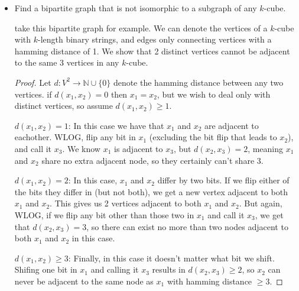 \documentclass[11pt]{article}
\newcommand\itm[1]{\item[\textbf{#1}]}
\newcommand{\n}{\vspace{0.5cm}}
\begin{document}
\begin{itemize}
  \itm{1.4.4} Find a bipartite graph that is not isomorphic to a subgraph of any \(k\)-cube.

    \begin{center}
    \end{center}

    take this bipartite graph for example.  We can denote the vertices of a \(k\)-cube with \(k\)-length binary strings, and edges only connecting vertices with a hamming distance of 1.  We show that 2 distinct vertices cannot be adjacent to the same 3 vertices in any \(k\)-cube.
      \begin{proof}
        Let \(d \colon V^2 \to \mathbb{N} \cup \{0\}\) denote the hamming distance between any two vertices.  if \(d(x_1,x_2) = 0\) then \(x_1 = x_2\), but we wish to deal only with distinct vertices, so assume \(d(x_1,x_2) \geq 1\). \n

        \(d(x_1, x_2) = 1\): In this case we have that \(x_1\) and \(x_2\) are adjacent to eachother.  WLOG, flip any bit in \(x_1\) (excluding the bit flip that leads to \(x_2\)), and call it \(x_3\).  We know \(x_1\) is adjacent to \(x_3\), but \(d(x_2,x_3) = 2\), meaning \(x_1\) and \(x_2\) share no extra adjacent node, so they certainly can't share 3. \n

        \(d(x_1,x_2) = 2\): In this case, \(x_1\) and \(x_2\) differ by two bits.  If we flip either of the bits they differ in (but not both), we get a new vertex adjacent to both \(x_1\) and \(x_2\).  This gives us 2 vertices adjacent to both \(x_1\) and \(x_2\).  But again, WLOG, if we flip any bit other than those two in \(x_1\) and call it \(x_3\), we get that \(d(x_2,x_3) = 3\), so there can exist no more than two nodes adjacent to both \(x_1\) and \(x_2\) in this case. \n

        \(d(x_1,x_2) \geq 3\): Finally, in this case it doesn't matter what bit we shift.  Shifing one bit in \(x_1\) and calling it \(x_3\) results in \(d(x_2,x_3) \geq 2\), so \(x_2\) can never be adjacent to the same node as \(x_1\) with hamming distance \(\geq 3\). \n


\end{proof}
\end{itemize}
\end{document}

